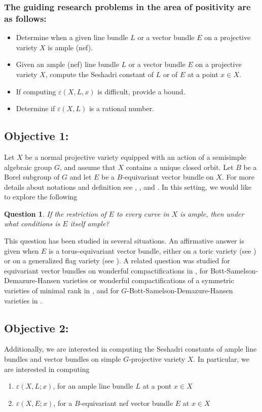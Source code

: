 \documentclass[11pt,reqno,a4paper]{amsart}
\newtheorem{question}[theorem]{Question}
\theoremstyle{remark}
\begin{document}
\subsubsection*{The guiding research problems in the area of positivity are as follows:}
\begin{itemize}
\item[(i)] Determine when a given line bundle $L$ or a vector bundle $E$ on a projective variety $X$ is ample (nef).
\item[(ii)] Given an ample (nef) line bundle $L$ or a vector bundle $E$ on a projective variety $X$, compute the Seshadri constant  of $L$ or of $E$ at a point $x \in X$.
\item[(iii)] If computing $\varepsilon(X, L, x)$ is difficult, provide a bound.
\item[(iv)] Determine if $\varepsilon(X, L)$ is a rational number.
\end{itemize}

\subsection*{Objective 1:}
Let $X$ be a normal projective variety equipped with an action of a semisimple algebraic group $G$, and assume that $X$ contains a unique closed orbit. Let $B$ be a Borel subgroup of $G$ and let $E$ be a $B$-equivariant vector bundle on $X$. 
For more details about notations and definition see \cite{bial}, \cite{konar}, and \cite{brion}. In this setting, we would like to explore the following
\begin{question}
If the restriction of $E$ to every curve in $X$ is ample, then under what conditions is $E$ itself ample?
\end{question}

This question has been studied in several situations. An affirmative answer is given when 
$E$ is a torus-equivariant vector bundle, either on a toric variety  (see \cite[Theorem 2.1]{HMP}) or on a 
generalized flag variety (see \cite{bhn}). A related question was studied for equivariant vector bundles on wonderful compactifications in \cite{BKN}, for Bott-Samelson-Demazure-Hansen varieties or wonderful compactifications of a symmetric varieties of minimal rank in \cite{bhks}, and for $G$-Bott-Samelson-Demazure-Hansen varieties in \cite{B-P}.

\subsection*{Objective 2:} Additionally, we are interested in computing the Seshadri constants of ample line bundles and 
vector bundles on simple $G$-projective variety $X$. In particular, we are interested in computing 
\begin{enumerate}
\item $\varepsilon(X,L;x)$, for an ample line bundle $L$ at a pont $x\in X$
\item $\varepsilon(X,E;x)$, for a $B$-equivariant nef vector bundle $E$ at $x \in X$
\end{enumerate}
\end{document}
